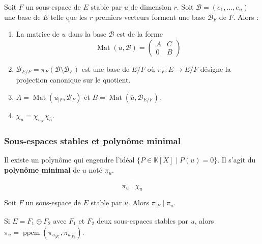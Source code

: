 
	\begin{proposition}
		Soit $F$ un sous-espace de $E$ stable par $u$ de dimension $r$. Soit $\mathcal{B} = (e_1, \dots, e_n)$ une base de $E$ telle que les $r$ premiers vecteurs forment une base $\mathcal{B}_F$ de $F$. Alors :
		\begin{enumerate}[label=(\roman*)]
			\item La matrice de $u$ dans la base $\mathcal{B}$ est de la forme
			\[ \operatorname{Mat}(u, \mathcal{B}) = \begin{pmatrix} A & C \\ 0 & B \end{pmatrix} \]
			\item $\mathcal{B}_{E/F} = \pi_F(\mathcal{B} \setminus \mathcal{B}_F)$ est une base de $E/F$ où $\pi_F : E \rightarrow E/F$ désigne la projection canonique sur le quotient.
			\item $A = \operatorname{Mat}(u_{|F}, \mathcal{B}_F)$ et $B = \operatorname{Mat}(\overline{u}, \mathcal{B}_{E/F})$.
			\item $\chi_u = \chi_{u_{|F}} \chi_{\overline{u}}$.
		\end{enumerate}
	\end{proposition}

	\newpage

	\subsubsection{Sous-espaces stables et polynôme minimal}

	\reference{161}

	\begin{proposition}
		Il existe un polynôme qui engendre l'idéal $\{ P \in \mathbb{K}[X] \mid P(u) = 0 \}$. Il s'agit du \textbf{polynôme minimal} de $u$ noté $\pi_u$.
	\end{proposition}

	\begin{theorem}
		\[ \pi_u \mid \chi_u \]
	\end{theorem}

	\begin{proposition}
		Soit $F$ un sous-espace de $E$ stable par $u$. Alors $\pi_{|F} \mid \pi_u$.
	\end{proposition}

	\begin{proposition}
		Si $E = F_1 \oplus F_2$ avec $F_1$ et $F_2$ deux sous-espaces stables par $u$, alors $\pi_u = \operatorname{ppcm}(\pi_{u_{|F_1}}, \pi_{u_{|F_2}})$.
	\end{proposition}

